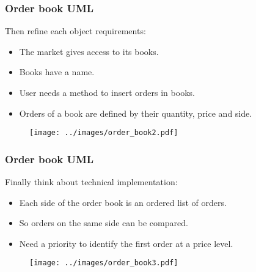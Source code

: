 \begin{frame}
\frametitle{Order book UML}
   \begin{minipage}{0.48\linewidth}
      Then refine each object requirements:
      \begin{itemize}
         \item The market gives access to its books.
         \item Books have a name.
         \item User needs a method to insert orders in books.
         \item Orders of a book are defined by their quantity, price and side.
      \end{itemize}
   \end{minipage}
   \begin{minipage}{0.48\linewidth}
      \begin{figure}
         \centering
         \texttt{[image: ../images/order\_book2.pdf]}
      \end{figure}
   \end{minipage}
\end{frame}

\begin{frame}
\frametitle{Order book UML}
   \begin{minipage}{0.48\linewidth}
      Finally think about technical implementation:
      \begin{itemize}
         \item Each side of the order book is an ordered list of orders.
         \item So orders on the same side can be compared.
         \item Need a priority to identify the first order at a price level.
      \end{itemize}
   \end{minipage}
   \begin{minipage}{0.48\linewidth}
      \begin{figure}
         \centering
         \texttt{[image: ../images/order\_book3.pdf]}
      \end{figure}
   \end{minipage}
\end{frame}



